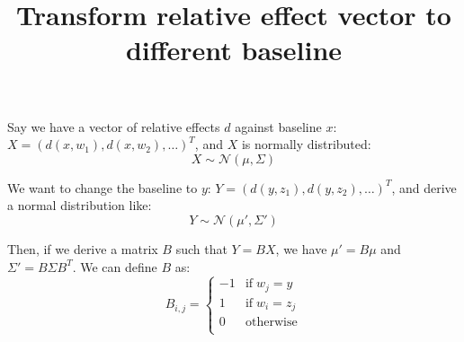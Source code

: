 \documentclass[a4paper]{article}
\title{Transform relative effect vector to different baseline}
\begin{document}
\maketitle

Say we have a vector of relative effects $d$ against baseline $x$: $X = (d(x, w_1), d(x, w_2), \dots)^T$, and $X$ is normally distributed:
$$
X \sim \mathcal{N}(\mu, \Sigma)
$$

We want to change the baseline to $y$: $Y = (d(y, z_1), d(y, z_2), \dots)^T$, and derive a normal distribution like:
$$
Y \sim \mathcal{N}(\mu', \Sigma')
$$

Then, if we derive a matrix $B$ such that $Y = BX$, we have $\mu' = B\mu$ and $\Sigma' = B\Sigma B^T$. We can define $B$ as:
$$
B_{i,j} = \left\{
\begin{array}{ll}
-1 & \mathrm{if}\; w_j = y \\
1 & \mathrm{if}\; w_i = z_j \\
0 & \mathrm{otherwise}\\
\end{array}
\right.
$$
\end{document}
